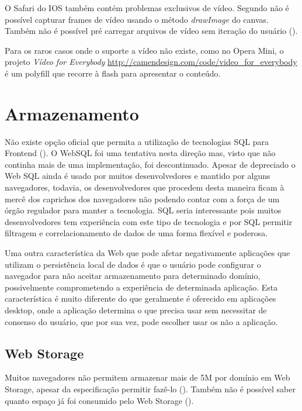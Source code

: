 O Safari do IOS também contém problemas exclusivos de vídeo. Segundo
\citet{unsolvedMediaHtmlIssues} não é possível capturar frames de
vídeo usando o método \textit{drawImage} do canvas. Também não é
possível pré carregar arquivos de vídeo sem iteração do usuário
().

Para os raros casos onde o suporte a vídeo não existe,
como no Opera Mini, o projeto \textit{Vídeo for Everybody}
\url{http://camendesign.com/code/video_for_everybody} é um polyfill que
recorre à flash para apresentar o conteúdo.

\section{Armazenamento}

Não existe opção oficial que permita a utilização de tecnologias
SQL para Frontend (). O WebSQL foi uma
tentativa nesta direção mas, visto que não continha mais de uma
implementação, foi descontinuado. Apesar de depreciado o Web SQL ainda
é usado por muitos desenvolvedores e mantido por alguns navegadores,
todavia, os desenvolvedores que procedem desta maneira ficam à mercê
dos caprichos dos navegadores não podendo contar com a força de um
órgão regulador para manter a tecnologia. SQL seria interessante pois
muitos desenvolvedores tem experiência com este tipo de tecnologia e
por SQL permitir filtragem e correlacionamento de dados de uma forma
flexível e poderosa.

Uma outra característica da Web que pode afetar negativamente
aplicações que utilizam o persistência local de dados é que o
usuário pode configurar o navegador para não aceitar armazenamento
para determinado domínio, possivelmente comprometendo a experiência
de determinada aplicação. Esta característica é muito diferente do
que geralmente é oferecido em aplicações desktop, onde a aplicação
determina o que precisa usar sem necessitar de consenso do usuário, que
por sua vez, pode escolher usar os não a aplicação.

\subsection{Web Storage}

Muitos navegadores não permitem armazenar mais de 5M por domínio
em Web Storage, apesar da especificação permitir fazê-lo
\autocite{gameAssetManagement} (). Também
não é possível saber quanto espaço já foi consumido pelo Web
Storage ().

